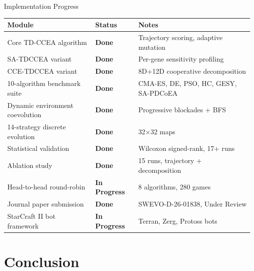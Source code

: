 \documentclass[aspectratio=169, 11pt]{beamer}
\begin{document}
\begin{frame}{Implementation Progress}
\scriptsize
\renewcommand{\arraystretch}{1.05}
\begin{tabular}{p{5.2cm}p{2.3cm}p{4.5cm}}
    \toprule
    \textbf{Module} & \textbf{Status} & \textbf{Notes}\\
    \midrule
    Core TD-CCEA algorithm          & \textcolor{doneGreen}{\textbf{Done}} & Trajectory scoring, adaptive mutation\\
    SA-TDCCEA variant               & \textcolor{doneGreen}{\textbf{Done}} & Per-gene sensitivity profiling\\
    CCE-TDCCEA variant              & \textcolor{doneGreen}{\textbf{Done}} & 8D+12D cooperative decomposition\\
    10-algorithm benchmark suite    & \textcolor{doneGreen}{\textbf{Done}} & CMA-ES, DE, PSO, HC, GESY, SA-PDCoEA\\
    Dynamic environment coevolution & \textcolor{doneGreen}{\textbf{Done}} & Progressive blockades + BFS\\
    14-strategy discrete evolution  & \textcolor{doneGreen}{\textbf{Done}} & 32$\times$32 maps\\
    Statistical validation          & \textcolor{doneGreen}{\textbf{Done}} & Wilcoxon signed-rank, 17+ runs\\
    Ablation study                  & \textcolor{doneGreen}{\textbf{Done}} & 15 runs, trajectory + decomposition\\
    Head-to-head round-robin        & \textcolor{progAmber}{\textbf{In Progress}} & 8 algorithms, 280 games\\
    Journal paper submission        & \textcolor{doneGreen}{\textbf{Done}} & SWEVO-D-26-01838, Under Review\\
    StarCraft II bot framework      & \textcolor{progAmber}{\textbf{In Progress}} & Terran, Zerg, Protoss bots\\
    
    \bottomrule
\end{tabular}
\end{frame}


\section{Conclusion}
\end{document}
